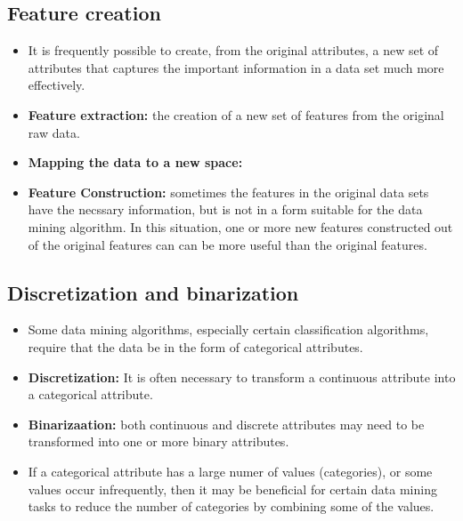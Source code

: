 	\subsection*{Feature creation}
		\begin{itemize}
			\item It is frequently possible to create, from the original attributes, a new set
			of attributes that captures the important information in a data set much more
			effectively. 
			\item {\bf Feature extraction:} the creation of a new set of features from the 
			original raw data. 
			\item {\bf Mapping the data to a new space:} 
			\item {\bf Feature Construction: } sometimes the features in the original data sets have
			the necssary information, but is not in a form suitable for the data mining algorithm.
			In this situation, one or more new features constructed out of the original features can
			can be more useful than the original features. 
		\end{itemize}

	\subsection*{Discretization and binarization}
		\begin{itemize}
			\item Some data mining algorithms, especially certain classification algorithms, 
			require that the data be in the form of categorical attributes. 
			\item {\bf Discretization:} It is often necessary to transform a continuous attribute into a categorical attribute.
			\item {\bf Binarizaation:} both continuous and discrete attributes may need to be 
			transformed into one or more binary attributes.
			\item If a categorical attribute has a large numer of values (categories), or some
			values occur infrequently, then it may be beneficial for certain data mining tasks
			to reduce the number of categories by combining some of the values. 
		\end{itemize}

